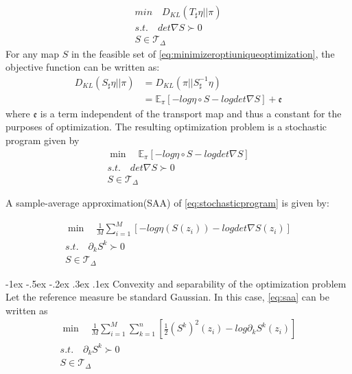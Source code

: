 \documentclass[a4paper, 11pt]{article}
\makeatletter
\newcommand{\xiaosihao}{\fontsize{12pt}{\baselineskip}\selectfont}
\renewcommand\subsubsection{\@startsection{subsubsection}{1}{\z@}%
{-1ex \@plus -.5ex \@minus -.2ex}%
{.3ex \@plus .1ex}%
{\normalfont\xiaosihao\CJKfamily{hei}}}
\makeatother
\begin{document}
\begin{CJK}{UTF8}{gbsn}
\begin{equation}\label{eq:minimizeroptiuniqueoptimization}
\begin{aligned}
min \quad D_{KL}(T_{\sharp}\eta || \pi)\\
s.t. \quad det \nabla S \succ 0 \\
S \in \mathcal{T}_{\Delta}
\end{aligned}
\end{equation}
For any map $S$ in the feasible set of \eqref{eq:minimizeroptiuniqueoptimization}, the objective function can be written as:
\begin{equation}\label{eq:objectfunction}
\begin{aligned}
  D_{KL}(S_{\sharp}\eta || \pi) & = D_{KL}(  \pi || S_{\sharp}^{-1}\eta )\\
& = \mathbb{E}_{\pi} [-log \eta \circ S - log det \nabla S ] + \mathfrak{e}
\end{aligned}
\end{equation}
where $\mathfrak{e}$ is a term independent of the transport map and thus a constant for the purposes of optimization. The resulting optimization problem is a stochastic program given by
\begin{equation}\label{eq:stochasticprogram}
\begin{aligned}
 \min \quad \mathbb{E}_{\pi} [-log \eta \circ S - log det \nabla S ]\\
 s.t. \quad det \nabla S \succ 0 \\
S \in \mathcal{T}_{\Delta}
\end{aligned}
\end{equation}

A sample-average approximation(SAA) of \eqref{eq:stochasticprogram} is given by:

\begin{equation}\label{eq:saa}
\begin{aligned}
 \min \quad \frac{1}{M} \sum_{i=1}^M [-log \eta (S(z_i)) - log det \nabla S(z_i) ]\\
 s.t. \quad  \partial_k S^k \succ 0 \\
S \in \mathcal{T}_{\Delta}
\end{aligned}
\end{equation}

\subsubsection{Convexity and separability of the optimization problem}
Let the reference measure be standard Gaussian. In this case, \eqref{eq:saa} can be written as
\begin{equation}\label{eq:saagaussian}
\begin{aligned}
 \min \quad \frac{1}{M} \sum_{i=1}^M \sum_{k=1}^n \left[ \frac{1}{2}(S^k)^2(z_i) - log \partial_k S^k(z_i) \right]\\
 s.t. \quad  \partial_k S^k \succ 0 \\
S \in \mathcal{T}_{\Delta}
\end{aligned}
\end{equation}


\end{CJK}
\end{document}
